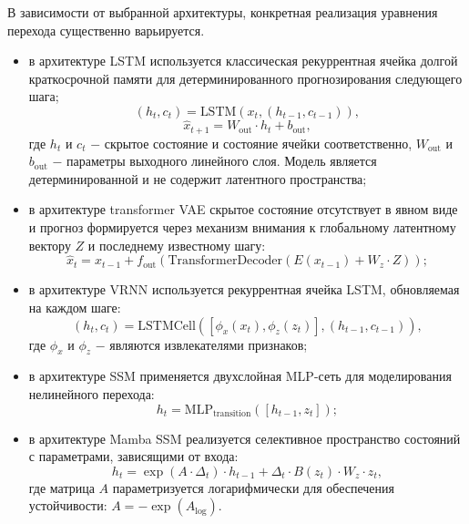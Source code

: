 \documentclass[14pt, a4paper, oneside]{extreport}
\begin{document}
В зависимости от выбранной архитектуры, конкретная реализация уравнения перехода существенно варьируется.

\begin{itemize}
    \item в архитектуре LSTM используется классическая рекуррентная ячейка долгой краткосрочной памяти для детерминированного прогнозирования следующего шага;
    \begin{equation}
    (h_t, c_t) = \text{LSTM}\left(x_t, (h_{t-1}, c_{t-1})\right),
    \end{equation}
    \begin{equation}
    \hat{x}_{t+1} = W_{\text{out}} \cdot h_t + b_{\text{out}},
    \end{equation}
    где $h_t$ и $c_t$ $-$ скрытое состояние и состояние ячейки соответственно, $W_{\text{out}}$ и $b_{\text{out}}$ $-$ параметры выходного линейного слоя. Модель является детерминированной и не содержит латентного пространства;
    
    \item в архитектуре transformer VAE скрытое состояние отсутствует в явном виде и прогноз формируется через механизм внимания к глобальному латентному вектору $Z$ и последнему известному шагу:
    \begin{equation}
    \hat{x}_t = x_{t-1} + f_{\text{out}}\left(\text{TransformerDecoder}\left(E(x_{t-1}) + W_z \cdot Z\right)\right);
    \end{equation}
    
    \item в архитектуре VRNN используется рекуррентная ячейка LSTM, обновляемая на каждом шаге:
    \begin{equation}
    (h_t, c_t) = \text{LSTMCell}\left([\phi_x(x_t), \phi_z(z_t)], (h_{t-1}, c_{t-1})\right),
    \end{equation}
    где $\phi_x$ и $\phi_z$ $-$ являются извлекателями признаков;
    
    \item в архитектуре SSM применяется двухслойная MLP-сеть для моделирования нелинейного перехода:
    \begin{equation}
    h_t = \text{MLP}_{\text{transition}}\left([h_{t-1}, z_t]\right);
    \end{equation}
    
    \item в архитектуре Mamba SSM реализуется селективное пространство состояний с параметрами, зависящими от входа:
    \begin{equation}
    h_t = \exp(A \cdot \Delta_t) \cdot h_{t-1} + \Delta_t \cdot B(z_t) \cdot W_z \cdot z_t,
    \end{equation}
    где матрица $A$ параметризуется логарифмически для обеспечения устойчивости: $A = -\exp(A_{\log})$.
\end{itemize}
\end{document}
